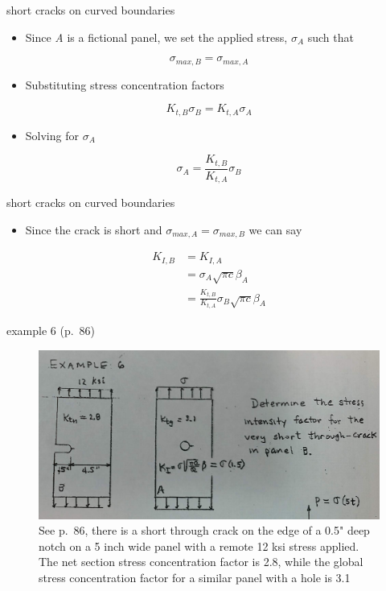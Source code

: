\documentclass[
  letterpaper,
  ignorenonframetext,
  aspectratio=43,
  handout,
  12pt]{beamer}
\providecommand{\tightlist}{%
  \setlength{\itemsep}{0pt}\setlength{\parskip}{0pt}}
\providecommand{\tightlist}{%
\setlength{\itemsep}{0pt}\setlength{\parskip}{0pt}}
\let\Oldincludegraphics\includegraphics
\renewcommand{\includegraphics}[2][]{\Oldincludegraphics[width=\textwidth,height=0.7\textheight,keepaspectratio]{#2}}
\begin{document}
\begin{frame}{short cracks on curved boundaries}
\protect\hypertarget{short-cracks-on-curved-boundaries-3}{}
\begin{itemize}
\tightlist
\item
  Since \emph{A} is a fictional panel, we set the applied stress,
  \(\sigma_A\) such that
\end{itemize}

\[\sigma_{max,B} = \sigma_{max,A}\]

\begin{itemize}
\tightlist
\item
  Substituting stress concentration factors
\end{itemize}

\[K_{t,B} \sigma_B = K_{t,A} \sigma_A\]

\begin{itemize}
\tightlist
\item
  Solving for \(\sigma_A\)
\end{itemize}

\[\sigma_A = \frac{K_{t,B}}{K_{t,A}}\sigma_B\]
\end{frame}

\begin{frame}{short cracks on curved boundaries}
\protect\hypertarget{short-cracks-on-curved-boundaries-4}{}
\begin{itemize}
\tightlist
\item
  Since the crack is short and \(\sigma_{max, A} = \sigma_{max, B}\) we
  can say
\end{itemize}

\[\begin{aligned}
  K_{I,B} &= K_{I,A}\\
  &= \sigma_A \sqrt{\pi c} \beta_A\\
  &= \frac{K_{t,B}}{K_{t,A}}\sigma_B \sqrt{\pi c} \beta_A
\end{aligned}\]
\end{frame}

\begin{frame}{example 6 (p.~86)}
\protect\hypertarget{example-6-p.-86}{}
\begin{figure}
\centering
\includegraphics{../images/example-86-6.jpg}
\caption{See p.~86, there is a short through crack on the edge of a 0.5"
deep notch on a 5 inch wide panel with a remote 12 ksi stress applied.
The net section stress concentration factor is 2.8, while the global
stress concentration factor for a similar panel with a hole is 3.1}
\end{figure}
\end{frame}
\end{document}
